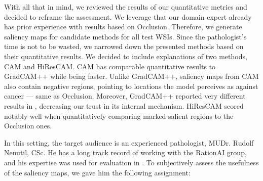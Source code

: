 With all that in mind, we reviewed the results of our quantitative metrics and decided to reframe the assessment.
We leverage that our domain expert already has prior experience with results based on Occlusion.
Therefore, we generate saliency maps for candidate methods for all test WSIs.
Since the pathologist's time is not to be wasted, we narrowed down the presented methods based on their quantitative results.
We decided to include explanations of two methods, CAM and HiResCAM.
CAM has comparable quantitative results to GradCAM++ while being faster.
Unlike GradCAM++, saliency maps from CAM also contain negative regions, pointing to locations the model perceives as against cancer --- same as Occlusion.
Moreover, GradCAM++ reported very different results in , decreasing our trust in its internal mechanism.
HiResCAM scored notably well when quantitatively comparing marked salient regions to the Occlusion ones.

In this setting, the target audience is an experienced pathologist, MUDr. Rudolf Nenutil, CSc.
He has a long track record of working with the RationAI group, and his expertise was used for evaluation in \cite{gallo}.
To subjectively assess the usefulness of the saliency maps, we gave him the following assignment:

